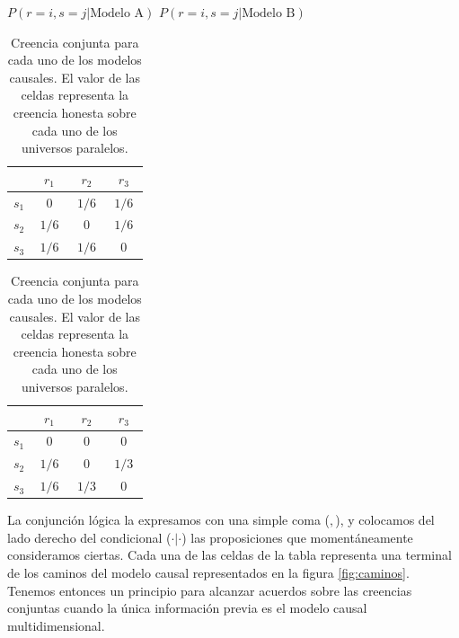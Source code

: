 \documentclass[a4paper,10pt]{book}
\theoremstyle{definition}
\begin{document}
\begin{table}[ht!]
\centering
$P(r=i, s=j | \text{Modelo A})$ \hspace{1.8cm} $P(r=i, s=j | \text{Modelo B})$ \\[0.1cm]
 \begin{tabular}{|c|c|c|c|} \hline \setlength\tabcolsep{0.4cm}
       & \, $r_1$ \, &  \, $r_2$ \, & \, $r_3$ \, \\ \hline 
  $s_1$ & $0$ & $1/6$ & $1/6$  \\ \hline
  $s_2$ & $1/6$ & $0$ & $1/6$  \\ \hline
  $s_3$ & $1/6$ & $1/6$ & $0$ \\ \hline 
  \end{tabular}
  \hspace{1.5cm}
  \begin{tabular}{|c|c|c|c|} \hline  \setlength\tabcolsep{0.4cm} 
 & \, $r_1$ \, &  \, $r_2$ \, & \, $r_3$ \,  \\ \hline 
  $s_1$ & $0$ & $0$ & $0$ \\ \hline
  $s_2$ & $1/6$ & $0$ & $1/3$ \\ \hline
  $s_3$ & $1/6$ & $1/3$ & $0$  \\ \hline  
  \end{tabular}
  \caption{Creencia conjunta para cada uno de los modelos causales. El valor de las celdas representa la creencia honesta sobre cada uno de los universos paralelos. }
  \label{tab:creencia_conjunta}
\end{table}
%
La conjunci\'on l\'ogica la expresamos con una simple coma ($,$), y colocamos del lado derecho del condicional ($\cdot|\cdot$) las proposiciones que momentáneamente consideramos ciertas.
%
Cada una de las celdas de la tabla representa una terminal de los caminos del modelo causal representados en la figura \ref{fig:caminos}.
%
Tenemos entonces un principio para alcanzar acuerdos sobre las creencias conjuntas cuando la \'unica informaci\'on previa es el modelo causal multidimensional.
\end{document}
